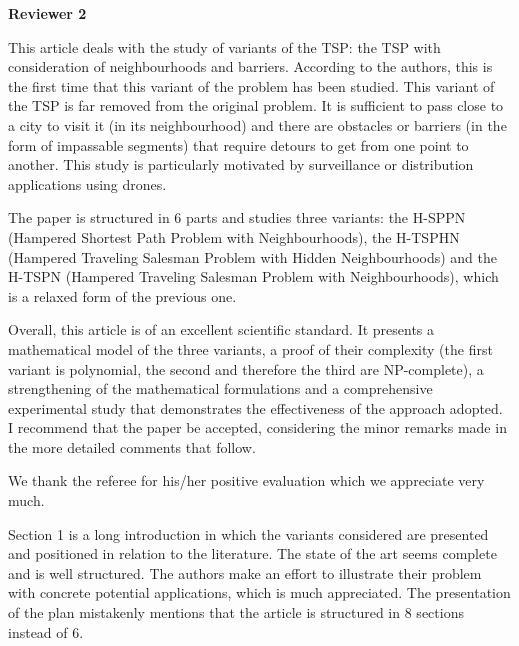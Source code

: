 \documentclass{article}
\newenvironment{reviewer}{\setcounter{pointcounter}{1}}{}
\newcommand{\point}{\text{{\selectfont \thepointcounter} \stepcounter{pointcounter}}}
\begin{document}
	\newpage
	\begin{reviewer}
		
		\begin{tcolorbox}[breakable,enhanced,coltitle=black,colback=green!75!black,colframe=green!75!black,borderline={1pt}{0pt}{black},boxrule=0pt]
			\textbf{Reviewer 2}
		\end{tcolorbox}
		
		\begin{itshape}
			This article deals with the study of variants of the TSP: the TSP with consideration of neighbourhoods and barriers. According to the authors, this is the first time that this variant of the problem has been studied. This variant of the TSP is far removed from the original problem. It is sufficient to pass close to a city to visit it (in its neighbourhood) and there are obstacles or barriers (in the form of impassable segments) that require detours to get from one point to another. This study is particularly motivated by surveillance or distribution applications using drones.
			
			The paper is structured in 6 parts and studies three variants: the H-SPPN (Hampered Shortest Path Problem with Neighbourhoods), the H-TSPHN (Hampered Traveling Salesman Problem with Hidden Neighbourhoods) and the H-TSPN (Hampered Traveling Salesman Problem with Neighbourhoods), which is a relaxed form of the previous one.
			
			Overall, this article is of an excellent scientific standard. It presents a mathematical model of the three variants, a proof of their complexity (the first variant is polynomial, the second and therefore the third are NP-complete), a strengthening of the mathematical formulations and a comprehensive experimental study that demonstrates the effectiveness of the approach adopted. I recommend that the paper be accepted, considering the minor remarks made in the more detailed comments that follow.
		\end{itshape}
		
		\begin{tcolorbox}[breakable,enhanced,coltitle=black,colback=green!5!white,colframe=green!75!black,title=\textbf{Answer R2.\point},borderline={1pt}{0pt}{black},boxrule=0pt]
		We thank the referee for his/her positive evaluation which we appreciate very much.
			
		\end{tcolorbox}
		
		\begin{itshape}
			Section 1 is a long introduction in which the variants considered are presented and positioned in relation to the literature. The state of the art seems complete and is well structured. The authors make an effort to illustrate their problem with concrete potential applications, which is much appreciated. The presentation of the plan mistakenly mentions that the article is structured in 8 sections instead of 6.
		\end{itshape}
		

\end{reviewer}
\end{document}
